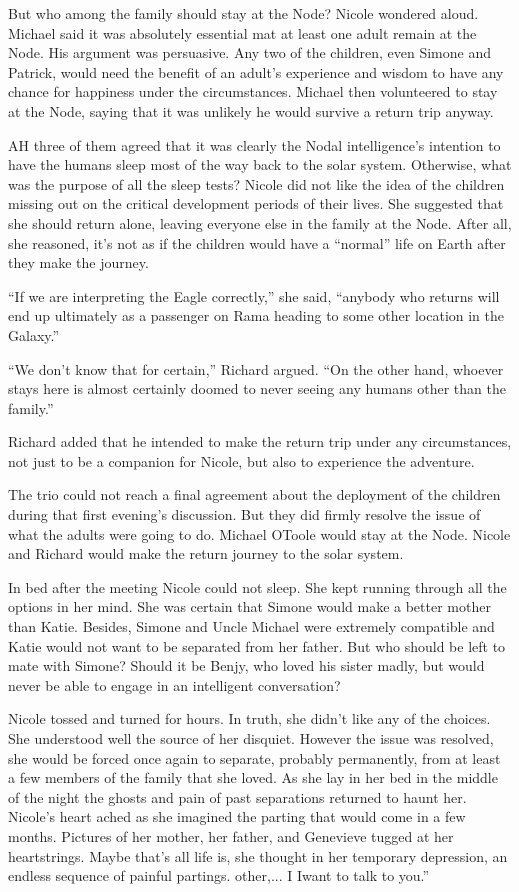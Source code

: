 \documentclass[]{article}
\begin{document}
{But who among the family should stay at the Node? Nicole wondered aloud.  Michael said it was absolutely essential mat at least one adult remain at the Node.  His argument was persuasive.  Any two of the children, even Simone and Patrick, would need the benefit of an adult’s experience and wisdom to have any chance for happiness under the circumstances.  Michael then volunteered to stay at the Node, saying that it was unlikely he would survive a return trip anyway.

AH three of them agreed that it was clearly the Nodal intelligence’s intention to have the humans sleep most of the way back to the solar system.  Otherwise, what was the purpose of all the sleep tests? Nicole did not like the idea of the children missing out on the critical development periods of their lives.  She suggested that she should return alone, leaving everyone else in the family at the Node.  After all, she reasoned, it’s not as if the children would have a “normal” life on Earth after they make the journey.

“If we are interpreting the Eagle correctly,” she said, “anybody who returns will end up ultimately as a passenger on Rama heading to some other location in the Galaxy.”

“We don’t know that for certain,” Richard argued.  “On the other hand, whoever stays here is almost certainly doomed to never seeing any humans other than the family.”

Richard added that he intended to make the return trip under any circumstances, not just to be a companion for Nicole, but also to experience the adventure.

The trio could not reach a final agreement about the deployment of the children during that first evening’s discussion.  But they did firmly resolve the issue of what the adults were going to do.  Michael OToole would stay at the Node.  Nicole and Richard would make the return journey to the solar system.

In bed after the meeting Nicole could not sleep.  She kept running through all the options in her mind.  She was certain that Simone would make a better mother than Katie.  Besides, Simone and Uncle Michael were extremely compatible and Katie would not want to be separated from her father.  But who should be left to mate with Simone? Should it be Benjy, who loved his sister madly, but would never be able to engage in an intelligent conversation?

Nicole tossed and turned for hours.  In truth, she didn’t like any of the choices.  She understood well the source of her disquiet.  However the issue was resolved, she would be forced once again to separate, probably permanently, from at least a few members of the family that she loved.  As she lay in her bed in the middle of the night the ghosts and pain of past separations returned to haunt her.  Nicole’s heart ached as she imagined the parting that would come in a few months.  Pictures of her mother, her father, and Genevieve tugged at her heartstrings.  Maybe that’s all life is, she thought in her temporary depression, an endless sequence of painful partings.  other,...  I Iwant to talk to you.”

}
\end{document}

